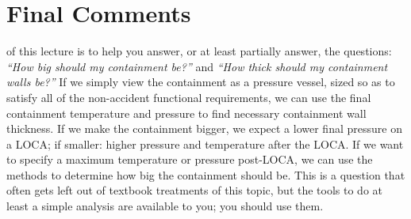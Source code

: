 \section{Final Comments}
 of this lecture is to help you answer, or at least partially answer, the questions: \emph{``How big should my containment be?''} and \emph{``How thick should my containment walls be?''}  If we simply view the containment as a pressure vessel, sized so as to satisfy all of the non-accident functional requirements, we can use the final containment temperature and pressure to find necessary containment wall thickness.  If we make the containment bigger, we expect a lower final pressure on a LOCA; if smaller: higher pressure and temperature after the LOCA.  If we want to specify a maximum temperature or pressure post-LOCA, we can use the methods to determine how big the containment should be.  This is a question that often gets left out of textbook treatments of this topic, but the tools to do at least a simple analysis are available to you; you should use them. 

